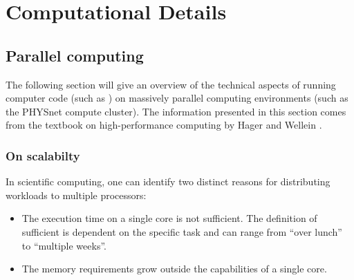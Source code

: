 \documentclass[main.tex]{subfiles}
\begin{document}
\chapter{Computational Details\label{ch:computation}}

\section{Parallel computing\label{sec:parallel_computing}}

The following section will give an overview of the technical aspects of running computer code (such as \QE) on massively parallel computing environments (such as the PHYSnet compute cluster).
The information presented in this section comes from the textbook on high-performance computing by Hager and Wellein \cite{hager_introduction_2010}.

\subsection{On scalabilty}\label{sub:scalability_general}

In scientific computing, one can identify two distinct reasons for distributing workloads to multiple processors:
\begin{itemize}
    \item The execution time on a single core is not sufficient. The definition of sufficient is dependent on the specific task and can range from \enquote{over lunch} to \enquote{multiple weeks}.
    \item The memory requirements grow outside the capabilities of a single core.
\end{itemize}
\end{document}
